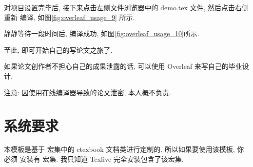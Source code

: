 \documentclass[bibsec, doctor, tabtoc]{cugthesis}
\begin{document}
对项目设置完毕后, 接下来点击左侧文件浏览器中的 demo.tex 文件, 然后点击右侧重新
编译, 如图\ref{fig:overleaf_usage_9} 所示.


静静等待一段时间后, 编译成功, 如图\ref{fig:overleaf_usage_10}所示.


至此, 即可开始自己的写论文之旅了.

如果论文创作者不担心自己的成果泄露的话, 可以使用 Overleaf 来写自己的毕业设计.

注意: 因使用在线编译器导致的论文泄密, 本人概不负责.

\section{系统要求}
\label{sec:xi_tong_yao_qiu_}
本模板是基于 \CTeX{} 宏集中的 ctexbook 文档类进行定制的. 所以如果要使用该模板, 你必须
安装有 \CTeX{} 宏集. 我只知道 Texlive 完全安装包含了该宏集.
\end{document}
